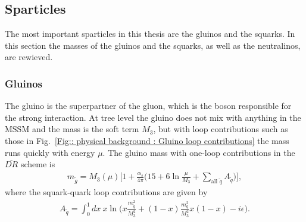 \documentclass[twoside,english]{uiofysmaster}
\begin{document}
{\subsection{Sparticles}

The most important sparticles in this thesis are the gluinos and the squarks. In this section the masses of the gluinos and the squarks, as well as the neutralinos, are rewieved.

\subsubsection{Gluinos}

The gluino is the superpartner of the gluon, which is the boson responsible for the strong interaction. At tree level the gluino does not mix with anything in the MSSM and the mass is the soft term $M_3$, but with loop contributions such as those in Fig.~\ref{Fig:: physical background : Gluino loop contributions} the mass runs quickly with energy $\mu$. The gluino mass with one-loop contributions in the $\overline{DR}$ scheme is 
\begin{align}
m_{\widetilde{g}} = M_3 (\mu) \Bigg[ 1 + \frac{\alpha_s}{4 \pi} \Bigg( 15 + 6 \ln \frac{\mu}{M_3} + \sum_{\text{all } \widetilde{q}} A_{\widetilde{q}} \Bigg) \Bigg],
\end{align}
where the squark-quark loop contributions are given by
\begin{align}
A_{\widetilde{q}} = \int_0^1 dx~ x \ln \big(x \frac{m_{\widetilde{q}}^2}{M_3^2} + (1-x) \frac{m_q^2}{M_3^2} x(1-x) - i \epsilon \big).
\end{align}



\begin{figure}
\end{figure}}
\end{document}

